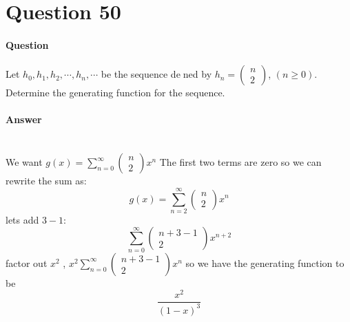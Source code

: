 \documentclass[UTF8]{article}
\begin{document}
\section{Question 50}
\paragraph{Question}
Let $ h_{0}, h_{1}, h_{2}, \cdots ,h_{n}, \cdots $ be the sequence dened by $ h_{n} = \begin{pmatrix} n \\ 2 \end{pmatrix} $, $ (n \geq 0) $. Determine the generating function for the sequence.
\paragraph{Answer}
~\\
We want $ g(x) = \sum_{n = 0}^\infty \begin{pmatrix} n \\ 2 \end{pmatrix} x^n $
The first two terms are zero so we can rewrite the sum as: 
$$ g(x) = \sum_{n = 2}^\infty \begin{pmatrix} n \\ 2 \end{pmatrix} x^n $$
lets add $ 3-1 $: 
$$ \sum_{n = 0}^\infty \begin{pmatrix} n + 3 - 1 \\ 2 \end{pmatrix} x^{n + 2} $$      
factor out $ x^2 $ , $ x^2 \sum_{n = 0}^\infty \begin{pmatrix} n + 3 - 1 \\ 2 \end{pmatrix} x^{n} $
so we have the generating function to be \\
$$ \frac{x^2}{(1 - x)^3} $$
\end{document}
